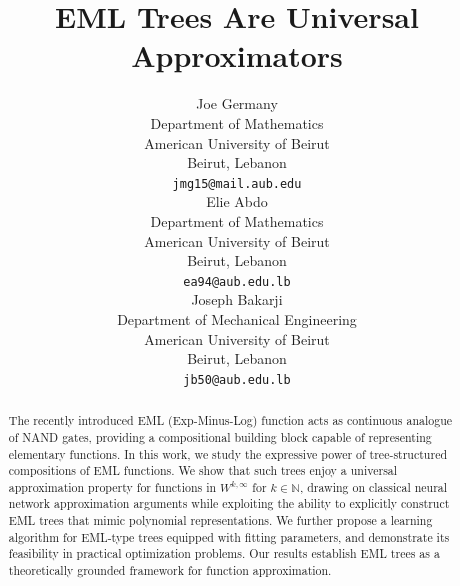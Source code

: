 \documentclass{article}
\title{EML Trees Are Universal Approximators}
\author{%
  Joe Germany \\
  Department of Mathematics \\
  American University of Beirut \\
  Beirut, Lebanon \\
  \texttt{jmg15@mail.aub.edu} \\
  \And
  Elie Abdo \\
  Department of Mathematics \\
  American University of Beirut \\
  Beirut, Lebanon \\
  \texttt{ea94@aub.edu.lb} \\
  \And
  Joseph Bakarji \\
  Department of Mechanical Engineering \\
  American University of Beirut \\
  Beirut, Lebanon \\
  \texttt{jb50@aub.edu.lb} \\  
}
\newcommand{\todo}[1]{\textcolor{red}{#1}}
\numberwithin{Def}{section}
\newcommand{\N}{\mathbb N}
\begin{document}
\maketitle

\begin{abstract}




The recently introduced EML (Exp-Minus-Log) function acts as continuous analogue of NAND gates, providing a compositional building block capable of representing elementary functions. In this work, we study the expressive power of tree-structured compositions of EML functions. We show that such trees enjoy a universal approximation property for functions in $W^{k, \infty}$ for $k \in \N$, drawing on classical neural network approximation arguments while exploiting the ability to explicitly construct EML trees that mimic polynomial representations. We further propose a learning algorithm for EML-type trees equipped with fitting parameters, and demonstrate its feasibility in practical optimization problems. Our results establish EML trees as a theoretically grounded framework for function approximation.

\end{abstract}
\end{document}
